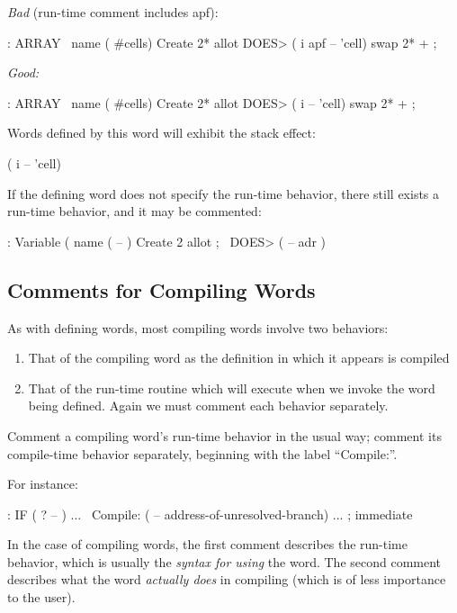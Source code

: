 \bigskip\noindent
\emph{Bad} (run-time comment includes apf):
\begin{Code}
: ARRAY   \  name  ( #cells)
   Create 2* allot
   DOES>   ( i apf -- 'cell)  swap  2* + ;
\end{Code}
\goodbreak\noindent
\emph{Good:}
\begin{Code}
: ARRAY   \  name  ( #cells)
   Create 2* allot
    DOES>  ( i -- 'cell)  swap  2* + ;
\end{Code}
Words defined by this word  will exhibit the stack effect:
\begin{Code}
( i -- 'cell)
\end{Code}
If the defining word does not specify the run-time behavior, there still
exists a run-time behavior, and it may be commented:
\begin{Code}
: Variable   (  name  ( -- )  Create  2 allot ;
   \ DOES>   ( -- adr )
\end{Code}
%

\subsection{Comments for Compiling Words}
As with defining words, most compiling words involve two behaviors:
\begin{enumerate}
\item That of the compiling word as the definition in which it appears
is compiled
\item That of the run-time routine which will execute when we invoke
the word being defined.  Again we must comment each behavior
separately.
\end{enumerate}

\begin{tip}
Comment a compiling word's run-time behavior in the usual way; comment
its compile-time behavior separately, beginning with the label
``Compile:''.
\end{tip}
For instance:
\begin{Code}
: IF   ( ? -- ) ...
\ Compile:   ( -- address-of-unresolved-branch)
   ... ; immediate
\end{Code}
In the case of compiling words, the first comment describes the
run-time behavior, which is usually the \emph{syntax for using} the
word.  The second comment describes what the word \emph{actually does}
in compiling (which is of less importance to the user).

